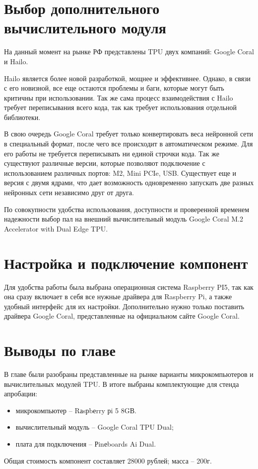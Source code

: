 \section{Выбор дополнительного вычислительного модуля}
На данный момент на рынке РФ представлены TPU двух компаний: Google Coral и Hailo. 

Hailo является более новой разработкой, мощнее и эффективнее. Однако, в связи с его новизной, все еще остаются проблемы и баги, которые могут быть критичны при использовании. Так же сама процесс взаимодействия с Hailo требует переписывания всего кода, так как требует использования отдельной библиотеки. 

В свою очередь Google Coral требует только конвертировать веса нейронной сети в специальный формат, после чего все происходит в автоматическом режиме. Для его работы не требуется переписывать ни единой строчки кода. 
Так же существуют различные версии, которые позволяют подключение с использованием различных портов: M2, Mini PCIe, USB. 
Существует еще и версия с двумя ядрами, что дает возможность одновременно запускать две разных нейронных сети независимо друг от друга. 

По совокупности удобства использования, доступности и проверенной временем надежности выбор пал на внешний вычислительный модуль Google Coral M.2 Accelerator with Dual Edge TPU. 

\section{Настройка и подключение компонент}
Для удобства работы была выбрана операционная система Raspberry PI5, так как она сразу включает в себя все нужные драйвера для Raspberry Pi, а также удобный интерфейс для их настройки. 
Дополнительно нужно только поставить драйвера Google Coral, представленные на официальном сайте Google Coral. 

\section{Выводы по главе}
В главе были разобраны представленные на рынке варианты микрокомпьютеров и вычислительных модулей TPU. В итоге выбраны комплектующие для стенда апробации:
\begin{itemize}
  \item микрокомпьютер -- Rаsрbеrry рi 5 8GВ.
  \item вычислительный модуль -- Google Coral TPU Dual;
  \item плата для подключения -- Рinеboards Ai Dual.
\end{itemize}
Общая стоимость компонент составляет 28000 рублей; масса -- 200г. 